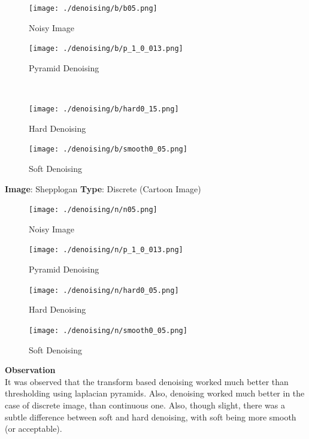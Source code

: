 \documentclass{article}
\begin{document}
    \begin{figure}[!htb]
      \texttt{[image: ./denoising/b/b05.png]}
      \caption{Noisy Image}
    \endminipage \hfill
      \texttt{[image: ./denoising/b/p\_1\_0\_013.png]}
      \caption{Pyramid Denoising}
    \endminipage
    \end{figure}\\
    

    \begin{figure}[!htb]
      \texttt{[image: ./denoising/b/hard0\_15.png]}
      \caption{Hard Denoising}
    \endminipage \hfill
      \texttt{[image: ./denoising/b/smooth0\_05.png]}
      \caption{Soft Denoising}
    \endminipage
    \end{figure}
    \pagebreak

    
    \pagebreak
    \textbf{Image}: Shepplogan  \textbf{Type}: Discrete (Cartoon Image)\\
    
    \begin{figure}[!htb]
      \texttt{[image: ./denoising/n/n05.png]}
      \caption{Noisy Image}
    \endminipage \hfill
      \texttt{[image: ./denoising/n/p\_1\_0\_013.png]}
      \caption{Pyramid Denoising}
    \endminipage
    \end{figure}
    

    \begin{figure}[!htb]
      \texttt{[image: ./denoising/n/hard0\_05.png]}
      \caption{Hard Denoising}
    \endminipage \hfill
      \texttt{[image: ./denoising/n/smooth0\_05.png]}
      \caption{Soft Denoising}
    \endminipage
    \end{figure}
    
    \textbf{Observation}\\
    It was observed that the transform based denoising worked much better than thresholding using laplacian pyramids. Also, denoising worked much better in the case of discrete image, than continuous one. Also, though slight, there was a subtle difference between soft and hard denoising, with soft being more smooth (or acceptable).
    
    
    \pagebreak

\end{document}
